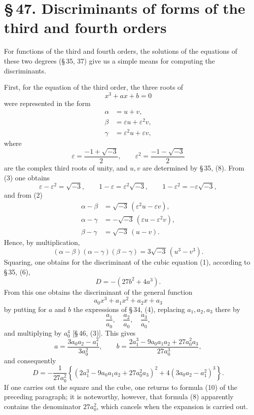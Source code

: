 \documentclass[11pt]{article}
\providecommand{\sect}[2]{\section*{\S\,#1. #2}}
\begin{document}
\sect{47}{Discriminants of forms of the third and fourth orders}

For functions of the third and fourth orders, the solutions of the equations of these two degrees (\S\,35, 37) give us a simple means for computing the discriminants.

First, for the equation of the third order, the three roots of
\begin{equation}
x^3+ax+b=0
\tag{1}
\end{equation}
were represented in the form
\begin{equation}
\begin{aligned}
\alpha&=u+v,\\
\beta&=\varepsilon u+\varepsilon^2v,\\
\gamma&=\varepsilon^2u+\varepsilon v,
\end{aligned}
\tag{2}
\end{equation}
where
\begin{equation}
 \varepsilon=\frac{-1+\sqrt{-3}}{2},\qquad
 \varepsilon^2=\frac{-1-\sqrt{-3}}{2}
\tag{3}
\end{equation}
are the complex third roots of unity, and $u,v$ are determined by \S\,35, (8). From (3) one obtains
\begin{equation}
 \varepsilon-\varepsilon^2=\sqrt{-3},\qquad
 1-\varepsilon=\varepsilon^2\sqrt{-3},\qquad
 1-\varepsilon^2=-\varepsilon\sqrt{-3},
\tag{4}
\end{equation}
and from (2)
\[
\begin{aligned}
\alpha-\beta&=\sqrt{-3}\,(\varepsilon^2u-\varepsilon v),\\
\alpha-\gamma&=-\sqrt{-3}\,(\varepsilon u-\varepsilon^2v),\\
\beta-\gamma&=\sqrt{-3}\,(u-v).
\end{aligned}
\]
Hence, by multiplication,
\begin{equation}
(\alpha-\beta)(\alpha-\gamma)(\beta-\gamma)=3\sqrt{-3}\,(u^3-v^3).
\tag{5}
\end{equation}
Squaring, one obtains for the discriminant of the cubic equation (1), according to \S\,35, (6),
\begin{equation}
D=-(27b^2+4a^3).
\tag{6}
\end{equation}
From this one obtains the discriminant of the general function
\begin{equation}
a_0x^3+a_1x^2+a_2x+a_3
\tag{7}
\end{equation}
by putting for $a$ and $b$ the expressions of \S\,34, (4), replacing $a_1,a_2,a_3$ there by
\[
\frac{a_1}{a_0},\quad \frac{a_2}{a_0},\quad \frac{a_3}{a_0},
\]
and multiplying by $a_0^4$ [\S\,46, (3)]. This gives
\[
 a=\frac{3a_0a_2-a_1^2}{3a_0^2},
 \qquad
 b=\frac{2a_1^3-9a_0a_1a_2+27a_0^2a_3}{27a_0^3},
\]
and consequently
\begin{equation}
D=-\frac{1}{27a_0^2}\left\{(2a_1^3-9a_0a_1a_2+27a_0^2a_3)^2
       +4(3a_0a_2-a_1^2)^3\right\}.
\tag{8}
\end{equation}
If one carries out the square and the cube, one returns to formula (10) of the preceding paragraph; it is noteworthy, however, that formula (8) apparently contains the denominator $27a_0^2$, which cancels when the expansion is carried out.
\end{document}
